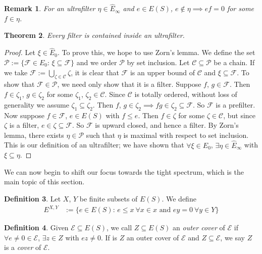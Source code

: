 \documentclass{article}
\newtheorem{theorem}{Theorem}[section]
\newtheorem{remark}[theorem]{Remark}
\theoremstyle{definition}
\newtheorem{definition}[theorem]{Definition}
\begin{document}
\begin{remark} For an ultrafilter $\eta \in \hat{E}_\infty$ and $e \in E(S)$, $e \notin \eta \implies ef = 0$ for some $f \in \eta$. \end{remark}

\begin{theorem} Every filter is contained inside an ultrafilter. \end{theorem}
\begin{proof}
    Let $\xi \in \hat{E}_0$. To prove this, we hope to use Zorn's lemma. We define the set 
    $\mathcal{P} := \{\mathcal{F} \in \hat{E_0} \text{: } \xi \subseteq \mathcal{F}\}$ and 
    we order $\mathcal{P}$ by set inclusion. Let $\mathcal{C} \subseteq \mathcal{P}$ be a chain. 
    If we take $\mathcal{F} := \bigcup_{\zeta \in \mathcal{C}} \zeta$, it is clear that $\mathcal{F}$ is 
    an upper bound of $\mathcal{C}$ and $\xi \subseteq \mathcal{F}$. To show that $\mathcal{F} \in \mathcal{P}$, we
    need only show that it is a filter. Suppose $f$, $g \in \mathcal{F}$. Then $f \in \zeta_1$, $g \in \zeta_2$ for
    some $\zeta_1$, $\zeta_2 \in \mathcal{C}$. Since $\mathcal{C}$ is totally ordered, without loss of generality we
    assume $\zeta_1 \subseteq \zeta_2$. Then $f$, $g \in \zeta_2 \implies fg \in \zeta_2 \subseteq \mathcal{F}$.
    So $\mathcal{F}$ is a prefilter. Now suppose $f \in \mathcal{F}$, $e \in E(S)$ with $f \leq e$. Then $f \in \zeta$ for
    some $\zeta \in \mathcal{C}$, but since $\zeta$ is a filter, $e \in \zeta \subseteq \mathcal{F}$. So $\mathcal{F}$ is
    upward closed, and hence a filter. By Zorn's lemma, there exists $\eta \in \mathcal{P}$ such that $\eta$ is maximal
    with respect to set inclusion. This is our definition of an ultrafilter; we have shown that $\forall \xi \in \hat{E}_0$, $\exists \eta \in \hat{E}_\infty$ with
    $\xi \subseteq \eta$.
\end{proof}

We can now begin to shift our focus towards the tight spectrum, which is the main topic of this section.

\begin{definition} Let $X$, $Y$ be finite subsets of $E(S)$. We define
    \begin{align*} 
        E^{X, Y} &:= \{ e \in E(S) \text{: } e \leq x \ \forall x \in x \text{ and } ey = 0 \ \forall y \in Y \}
    \end{align*}
\end{definition}

\begin{definition}
    Given $\mathcal{E} \subseteq E(S)$, we call $Z \subseteq E(S)$ an \textit{outer cover} of $\mathcal{E}$ if
    $\forall e \neq 0 \in \mathcal{E}$, $\exists z \in Z$ with $ez \neq 0$. If is $Z$ an outer cover of $\mathcal{E}$ 
    and $Z \subseteq \mathcal{E}$, we say $Z$ is a \textit{cover} of $\mathcal{E}$.
\end{definition}
\end{document}
